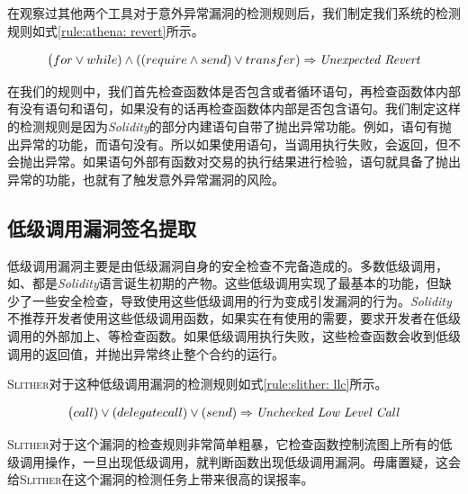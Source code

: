 在观察过其他两个工具对于意外异常漏洞的检测规则后，我们制定我们系统的检测规则如式\ref{rule:athena: revert}所示。
\begin{mdframed}[
	linewidth = 1pt,
	innertopmargin = -5pt,
	innerbottommargin = 3pt,
	outerlinewidth = 1pt
	]
    \small
	\begin{equation} \label{rule:athena: revert}
    \big (for \vee while) \wedge ((require \wedge send) \vee transfer)  \Rightarrow \text{\emph{Unexpected Revert}}
	\end{equation}
\end{mdframed}
在我们的规则中，我们首先检查函数体是否包含或者循环语句，再检查函数体内部有没有语句和语句，如果没有的话再检查函数体内部是否包含语句。我们制定这样的检测规则是因为\emph{Solidity}的部分内建语句自带了抛出异常功能。例如，语句有抛出异常的功能，而语句没有。所以如果使用语句，当调用执行失败，会返回，但不会抛出异常。如果语句外部有函数对交易的执行结果进行检验，语句就具备了抛出异常的功能，也就有了触发意外异常漏洞的风险。

\subsection{低级调用漏洞签名提取}
低级调用漏洞主要是由低级漏洞自身的安全检查不完备造成的。多数低级调用，如、都是\emph{Solidity}语言诞生初期的产物。这些低级调用实现了最基本的功能，但缺少了一些安全检查，导致使用这些低级调用的行为变成引发漏洞的行为。\emph{Solidity}不推荐开发者使用这些低级调用函数，如果实在有使用的需要，要求开发者在低级调用的外部加上、等检查函数。如果低级调用执行失败，这些检查函数会收到低级调用的返回值，并抛出异常终止整个合约的运行。

\textsc{Slither}对于这种低级调用漏洞的检测规则如式\ref{rule:slither: llc}所示。
\begin{mdframed}[
	linewidth = 1pt,
	innertopmargin = -5pt,
	innerbottommargin = 3pt,
	outerlinewidth = 1pt
	]
    \small
	\begin{equation} \label{rule:slither: llc}
    \big ( call) \vee (delegatecall) \vee (send) \Rightarrow \text{\emph{Unchecked Low Level Call}}
	\end{equation}
\end{mdframed}
\textsc{Slither}对于这个漏洞的检查规则非常简单粗暴，它检查函数控制流图上所有的低级调用操作，一旦出现低级调用，就判断函数出现低级调用漏洞。毋庸置疑，这会给\textsc{Slither}在这个漏洞的检测任务上带来很高的误报率。

